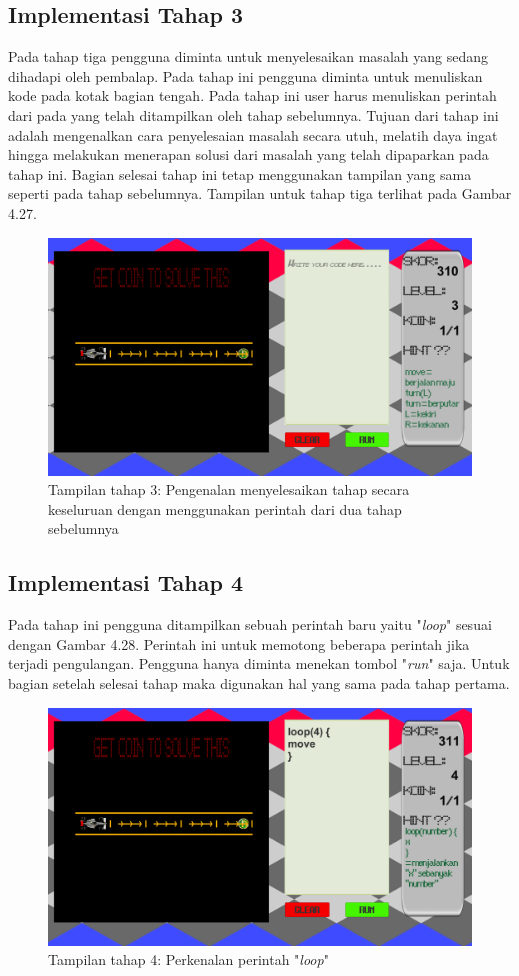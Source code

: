 	\subsection{Implementasi Tahap 3}
	Pada tahap tiga pengguna diminta untuk menyelesaikan masalah yang sedang dihadapi oleh pembalap. Pada tahap ini pengguna diminta untuk menuliskan kode pada kotak bagian tengah. Pada tahap ini user harus menuliskan perintah dari pada yang telah ditampilkan oleh tahap sebelumnya. Tujuan dari tahap ini adalah mengenalkan cara penyelesaian masalah secara utuh, melatih daya ingat hingga melakukan menerapan solusi dari masalah yang telah dipaparkan pada tahap ini. Bagian selesai tahap ini tetap menggunakan tampilan yang sama seperti pada tahap sebelumnya. Tampilan untuk tahap tiga terlihat pada Gambar 4.27.
	\begin{figure}
		\centering
		\includegraphics[width=\linewidth-40pt]{pics/prototipe/tahap3}
		\caption{Tampilan tahap 3: Pengenalan menyelesaikan tahap secara keseluruan dengan menggunakan perintah dari dua tahap sebelumnya}
	\end{figure}
	\subsection{Implementasi Tahap 4}
	Pada tahap ini pengguna ditampilkan sebuah perintah baru yaitu "\textit{loop}" sesuai dengan Gambar 4.28. Perintah ini untuk memotong beberapa perintah jika terjadi pengulangan. Pengguna hanya diminta menekan tombol "\textit{run}" saja. Untuk bagian setelah selesai tahap maka digunakan hal yang sama pada tahap pertama.
	\begin{figure}
		\centering
		\includegraphics[width=\linewidth-40pt]{pics/prototipe/tahap4}
		\caption{Tampilan tahap 4: Perkenalan perintah "\textit{loop}"}
	\end{figure}

